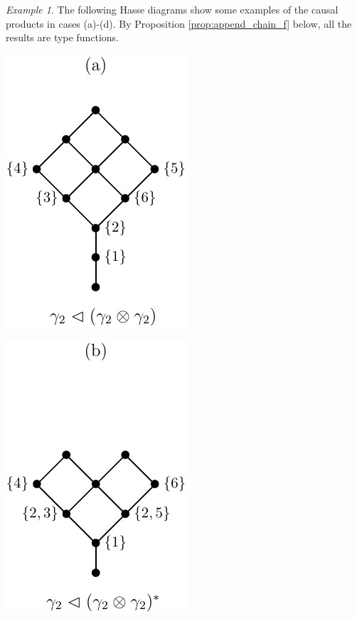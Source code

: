 \documentclass[12pt]{article}
\theoremstyle{definition}
\theoremstyle{remark}
\newtheorem{exm}{Example}
\begin{document}
\begin{exm}
The following Hasse diagrams show some examples of the causal products in cases (a)-(d).
By  Proposition
\ref{prop:append_chain_f} below, all the results are type functions. 

\begin{center}
\begin{minipage}[c]{0.2\textwidth}
\centering
\includegraphics[scale=0.7]{vtl_a.pdf}
\end{minipage}
\begin{minipage}[c]{0.2\textwidth}
\centering
\includegraphics[scale=0.7]{vtl_b.pdf}
\end{minipage}
\begin{minipage}[c]{0.2\textwidth}

\end{minipage}
\end{center}
\end{exm}
\end{document}
